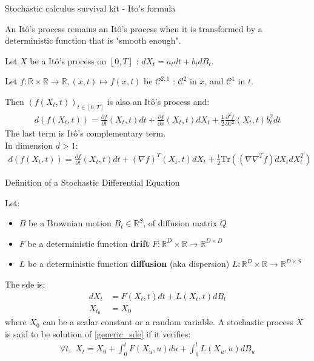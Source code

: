 %
%

\begin{frame}{Stochastic calculus survival kit - Ito's formula}
    
\begin{theorem}
An Itô's process remains an Itô's process when it is transformed by a deterministic function that is "smooth enough".

Let $X$ be a Itô's process on $[0,T]$ : $dX_t = a_tdt + b_t dB_t$.

Let $f : \mathbb{R} \times \mathbb{R} \rightarrow \mathbb{R}, (x,t) \mapsto f(x,t)$ be 
$\mathcal{C}^{2,1}$ : $\mathcal{C}^2$ in $x$, and $\mathcal{C}^1$ in $t$.

Then $(f(X_t,t))_{t \in [0,T]}$ is also an Itô's process and:
\begin{align}
    d\left( f(X_t,t) \right) = \frac{\partial f}{\partial t}(X_t,t) dt + \frac{\partial f}{\partial x}(X_t,t) dX_t + \frac{1}{2}\frac{\partial^2 f}{\partial x^2}(X_t,t)b_t^2 dt
\end{align}
The last term is Itô's complementary term.\\
In dimension $d > 1$:
\begin{align}
    d\left( f(X_t,t) \right) = \frac{\partial f}{\partial t}(X_t,t) dt + (\nabla f)^T (X_t,t) dX_t + \frac{1}{2}\text{Tr} \left( (\nabla \nabla^T f) dX_t dX_t^T \right)
\end{align}
\end{theorem}
\end{frame}

%
%

\begin{frame}{Definition of a Stochastic Differential Equation}
    \begin{definition}
            Let:
    \begin{itemize}
        \item $B$ be a Brownian motion $B_t \in \mathbb{R}^S$, of diffusion matrix $Q$
        \item $F$ be a deterministic function \textbf{drift} $F : \mathbb{R}^D \times \mathbb{R}\rightarrow \mathbb{R}^{D \times D}$
        \item $L$ be a deterministic function \textbf{diffusion} (aka dispersion) $L : \mathbb{R}^D \times \mathbb{R}\rightarrow \mathbb{R}^{D \times S}$ 
    \end{itemize}

    The \gls{sde} is:
    \begin{align}
        \label{generic_sde}
        dX_t &= F(X_t,t) dt + L(X_t,t) dB_t \\
        X_{t_0} &= X_0
    \end{align}
    where $X_0$ can be a scalar constant or a random variable.
    A stochastic process $X$ is said to be solution of \ref{generic_sde} if it verifies:
    \begin{align}
        \forall t, \,\, X_t = X_0 + \int_{0}^{t} F(X_u, u)du + \int_{0}^{t} L(X_u,u) dB_u
    \end{align}
    \end{definition}
\end{frame}

